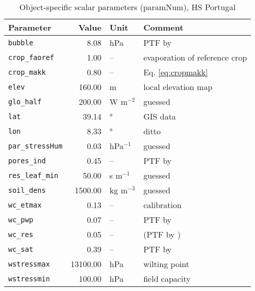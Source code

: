 \begin{table}[ht]
\centering
\caption{Object-specific scalar parameters (\textsf{paramNum}), HS Portugal} 
\label{tab:portugalHS_paramNum}
\begin{tabular}{lrll}
  \hline
Parameter & Value & Unit & Comment \\ 
  \hline
\verb!bubble! & 8.08 & hPa & PTF by \citet{rawls85} \\ 
  \verb!crop_faoref! & 1.00 & -- & evaporation of reference crop \\ 
  \verb!crop_makk! & 0.80 & -- & Eq. \eqref{eq:cropmakk} \\ 
  \verb!elev! & 160.00 & m & local elevation map \\ 
  \verb!glo_half! & 200.00 & W m$^{-2}$ & guessed \\ 
  \verb!lat! & 39.14 & ° & GIS data \\ 
  \verb!lon! & 8.33 & ° & ditto \\ 
  \verb!par_stressHum! & 0.03 & hPa$^{-1}$ & guessed \\ 
  \verb!pores_ind! & 0.45 & -- & PTF by \citet{rawls85} \\ 
  \verb!res_leaf_min! & 50.00 & s m$^{-1}$ & guessed \\ 
  \verb!soil_dens! & 1500.00 & kg m$^{-3}$ & guessed \\ 
  \verb!wc_etmax! & 0.13 & -- & calibration \\ 
  \verb!wc_pwp! & 0.07 & -- & PTF by \citet{rawls85} \\ 
  \verb!wc_res! & 0.05 & -- & (PTF by \citet{rawls85}) \\ 
  \verb!wc_sat! & 0.39 & -- & PTF by \citet{woesten99} \\ 
  \verb!wstressmax! & 13100.00 & hPa & wilting point \\ 
  \verb!wstressmin! & 100.00 & hPa & field capacity \\ 
   \hline
\end{tabular}
\end{table}
